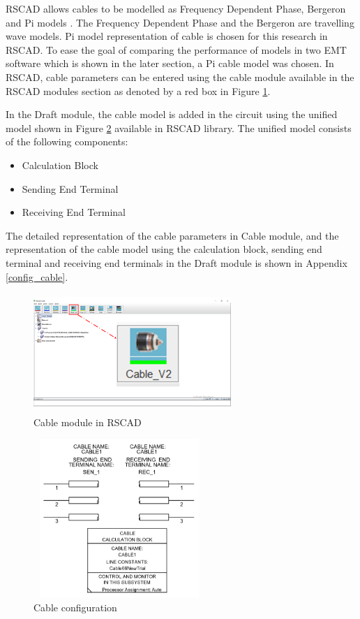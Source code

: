 RSCAD allows cables to be modelled as Frequency Dependent Phase, Bergeron and Pi models \cite{rtds_tech}. The Frequency Dependent Phase and the Bergeron are travelling wave models. Pi model representation of cable is chosen for this research in RSCAD. To ease the goal of comparing the performance of models in two \gls{EMT} software which is shown in the later section, a Pi cable model was chosen. In RSCAD, cable parameters can be entered using the cable module available in the RSCAD modules section as denoted by a red box in Figure \ref{fig:CableModule_mark}. 

 
In the Draft module, the cable model is added in the circuit using the unified model shown in Figure \ref{fig:CableParaBlock} available in RSCAD library. The unified model consists of the following components: 
    \begin{itemize}[noitemsep]
    \item Calculation Block
    \item Sending End Terminal
    \item Receiving End Terminal
\end{itemize}

The detailed representation of the cable parameters in Cable module, and the representation of the cable model using the calculation block, sending end terminal and receiving end terminals in the Draft module is shown in Appendix \ref{config_cable}.

\begin{figure}[H]
\centering
    \includegraphics[height = 4.5cm,width = 7.5cm]{Diagrams/Chapter_3/Cable_module_Final.png}
    \caption{Cable module in RSCAD}
    \label{fig:CableModule_mark}
\end{figure}

\begin{figure}[H]
  \centering
  \includegraphics[height = 6cm,width = 6.5cm]{Diagrams/Chapter_3/CableParaBlock.PNG}  
  \caption{Cable configuration}
  \label{fig:CableParaBlock}
\end{figure}

